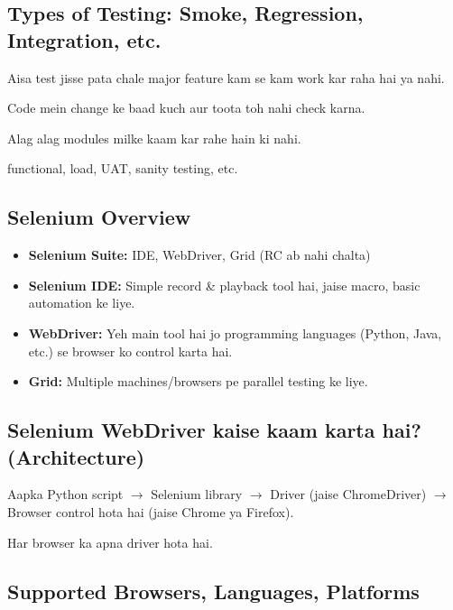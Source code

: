 \documentclass[a4paper,12pt]{article}
\begin{document}
\subsection{Types of Testing: Smoke, Regression, Integration, etc.}

\begin{description}[font=\color{sectionblue}\bfseries,leftmargin=!,labelwidth=4cm]
  \item[Smoke Testing:] Aisa test jisse pata chale major feature kam se kam work kar raha hai ya nahi.
  \item[Regression Testing:] Code mein change ke baad kuch aur toota toh nahi check karna.
  \item[Integration Testing:] Alag alag modules milke kaam kar rahe hain ki nahi.
  \item[Aur bhi:] functional, load, UAT, sanity testing, etc.
\end{description}

\subsection{Selenium Overview}

\begin{itemize}[leftmargin=*]
  \item \textbf{Selenium Suite:} IDE, WebDriver, Grid (RC ab nahi chalta)
  \item \textbf{Selenium IDE:} Simple record \& playback tool hai, jaise macro, basic automation ke liye.
  \item \textbf{WebDriver:} Yeh main tool hai jo programming languages (Python, Java, etc.) se browser ko control karta hai.
  \item \textbf{Grid:} Multiple machines/browsers pe parallel testing ke liye.
\end{itemize}

\subsection{Selenium WebDriver kaise kaam karta hai? (Architecture)}

Aapka Python script \(\to\) Selenium library \(\to\) Driver (jaise ChromeDriver) \(\to\) Browser control hota hai (jaise Chrome ya Firefox).

Har browser ka apna driver hota hai.

\subsection{Supported Browsers, Languages, Platforms}
\end{document}
